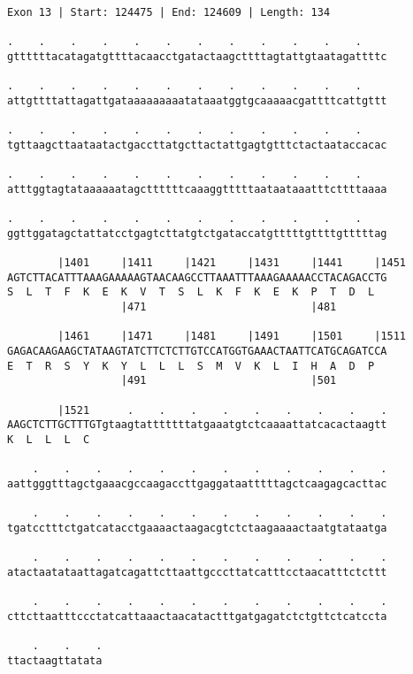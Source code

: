 \documentclass{article}
\begin{document}
\begin{Verbatim}
Exon 13 | Start: 124475 | End: 124609 | Length: 134
 
.    .    .    .    .    .    .    .    .    .    .    .    
gttttttacatagatgttttacaacctgatactaagcttttagtattgtaatagattttc
  
.    .    .    .    .    .    .    .    .    .    .    .    
attgttttattagattgataaaaaaaaatataaatggtgcaaaaacgattttcattgttt
  
.    .    .    .    .    .    .    .    .    .    .    .    
tgttaagcttaataatactgaccttatgcttactattgagtgtttctactaataccacac
  
.    .    .    .    .    .    .    .    .    .    .    .    
atttggtagtataaaaaatagcttttttcaaaggtttttaataataaatttcttttaaaa
  
.    .    .    .    .    .    .    .    .    .    .    .    
ggttggatagctattatcctgagtcttatgtctgataccatgtttttgttttgtttttag
  
        |1401     |1411     |1421     |1431     |1441     |1451
AGTCTTACATTTAAAGAAAAAGTAACAAGCCTTAAATTTAAAGAAAAACCTACAGACCTG
S  L  T  F  K  E  K  V  T  S  L  K  F  K  E  K  P  T  D  L  
                  |471                          |481        
  
        |1461     |1471     |1481     |1491     |1501     |1511
GAGACAAGAAGCTATAAGTATCTTCTCTTGTCCATGGTGAAACTAATTCATGCAGATCCA
E  T  R  S  Y  K  Y  L  L  L  S  M  V  K  L  I  H  A  D  P  
                  |491                          |501        
  
        |1521      .    .    .    .    .    .    .    .    .
AAGCTCTTGCTTTGTgtaagtatttttttatgaaatgtctcaaaattatcacactaagtt
K  L  L  L  C                                               
  
    .    .    .    .    .    .    .    .    .    .    .    .
aattgggtttagctgaaacgccaagaccttgaggataatttttagctcaagagcacttac
  
    .    .    .    .    .    .    .    .    .    .    .    .
tgatcctttctgatcatacctgaaaactaagacgtctctaagaaaactaatgtataatga
  
    .    .    .    .    .    .    .    .    .    .    .    .
atactaatataattagatcagattcttaattgcccttatcatttcctaacatttctcttt
  
    .    .    .    .    .    .    .    .    .    .    .    .
cttcttaatttccctatcattaaactaacatactttgatgagatctctgttctcatccta
  
    .    .    .
ttactaagttatata
\end{Verbatim}
\newpage
\end{document}
